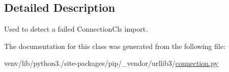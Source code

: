 \subsection{Detailed Description}
\begin{DoxyVerb}Used to detect a failed ConnectionCls import.\end{DoxyVerb}
 

The documentation for this class was generated from the following file\+:\begin{DoxyCompactItemize}
\item 
venv/lib/python3./site-\/packages/pip/\+\_\+vendor/urllib3/\hyperlink{connection_8py}{connection.\+py}\end{DoxyCompactItemize}
